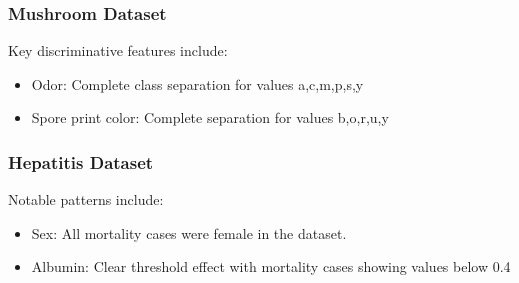 \subsubsection{Mushroom Dataset}
Key discriminative features include:
\begin{itemize}
	\item Odor: Complete class separation for values a,c,m,p,s,y
	\item Spore print color: Complete separation for values b,o,r,u,y
\end{itemize}

\subsubsection{Hepatitis Dataset}
Notable patterns include:
\begin{itemize}
	\item Sex: All mortality cases were female in the dataset.
	\item Albumin: Clear threshold effect with mortality cases showing values below 0.4
\end{itemize}
